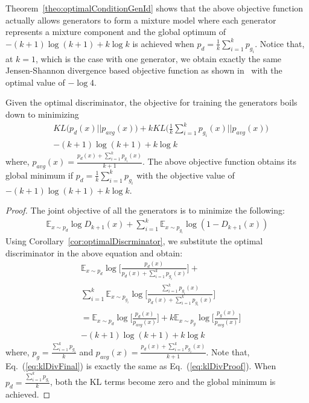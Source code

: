 Theorem~\ref{theo:optimalConditionGenId} shows that the above objective function actually allows generators to form a mixture model where each generator represents a mixture component and the global optimum of $-(k+1) \log (k+1) + k \log k$ is achieved when $p_d = \frac{1}{k} \sum_{i=1}^k p_{g_i}$. Notice that, at $k=1$, which is the case with one generator, we obtain exactly the same Jensen-Shannon divergence based objective function as shown in~\cite{goodfellow2014generative} with the optimal value of $-\log 4$.


\begin{theorem}
	\label{theo:optimalConditionGenId}
	Given the optimal discriminator, the objective for training the generators boils down to minimizing
	\begin{align}
		\label{eq:klDivProof}
		& KL \Big(p_d(x) ||  p_{avg}(x) \Big) + k KL \Big( \frac{1}{k} \sum_{i=1}^k p_{g_i} (x) ||  p_{avg}(x) \Big)  \nonumber \\
		&-(k+1) \log (k+1) + k \log k
	\end{align}
	where, $p_{avg} (x) = \frac{p_d(x) + \sum_{i=1}^k p_{g_i}(x)}{k+1}$. The above objective function obtains its global minimum if $p_d = \frac{1}{k} \sum_{i=1}^k p_{g_i}$ with the objective value of $-(k+1) \log (k+1) + k \log k$.
	\begin{proof}
		The joint objective of all the generators is to minimize the following:
		\begin{align}
			\mathbb{E}_{x\sim p_{d}}\log D_{k+1}(x) + \sum_{i=1}^{k}\mathbb{E}_{x \sim p_{g_i}}\log (1- D_{k+1}(x)) \nonumber 
		\end{align}
		Using Corollary~\ref{cor:optimalDiscrminator}, we substitute the optimal discriminator in the above equation and obtain:
		\begin{align}
			\label{eq:klDivFinal}
			& \mathbb{E}_{x\sim p_{d}}\log \Bigg [ \frac{p_d(x)}{p_d(x) + \sum_{i=1}^k p_{g_i}(x)} \Bigg]  + \nonumber \\
			&\sum_{i=1}^{k} \mathbb{E}_{x\sim p_{g_i}} \log \Bigg[ \frac{\sum_{i=1}^k p_{g_i}(x)}{p_d(x) + \sum_{i=1}^k p_{g_i}(x)} \Bigg] \nonumber \\
			&= \mathbb{E}_{x\sim p_{d}} \log \Bigg [ \frac{p_d(x)}{p_{avg}(x)} \Bigg]  + k \mathbb{E}_{x \sim p_g} \log \Bigg[ \frac{p_g(x)}{p_{avg}(x)} \Bigg] \nonumber \\
			&- (k+1) \log (k+1) + k \log k
		\end{align}
		where, $p_g=\frac{\sum_{i=1}^k p_{g_i}}{k}$ and $p_{avg} (x) = \frac{p_d(x) + \sum_{i=1}^k p_{g_i}(x)}{k+1}$. Note that, Eq.~(\ref{eq:klDivFinal}) is exactly the same as Eq.~(\ref{eq:klDivProof}). When $p_d = \frac{\sum_{i=1}^k p_{g_i}}{k}$, both the KL terms become zero and the global minimum is achieved. 
	\end{proof}
\end{theorem}

